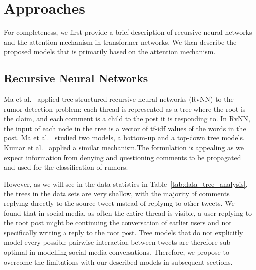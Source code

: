 \documentclass[letterpaper]{article} %
\begin{document}
\section{Approaches} \label{rumor_detection_transformer}

For completeness, we first provide a brief description of recursive neural networks and the attention mechanism in transformer networks. We then describe the proposed models that is primarily based on the attention mechanism. 

\subsection{Recursive Neural Networks}
\label{rvnn}

Ma et al.~ applied tree-structured recursive neural networks (RvNN) to the rumor detection problem: each thread is represented as a tree where the root is the claim, and each comment is a child to the post it is responding to.
In RvNN,  the input  of  each  node  in  the  tree is a vector of tf-idf values of the words in the post. Ma et al.~ studied two models, a bottom-up and a top-down tree models. Kumar et al.~ applied a similar mechanism.The formulation is appealing as we expect information from denying and questioning comments to be propagated and used for the classification of rumors. 

However, as we will see in the data statistics in Table~\ref{tab:data_tree_analysis}, the trees in the data sets are very shallow, with the majority of comments replying directly to the source tweet instead of replying to other tweets. We found that in social media, as often the entire thread is visible, a user replying to the root post might be continuing the conversation of earlier users and not specifically writing a reply to the root post. Tree models that do not explicitly model every possible pairwise interaction between tweets are therefore sub-optimal in modelling social media conversations. Therefore, we propose to overcome the limitations with our described models in subsequent sections. 
\end{document}
